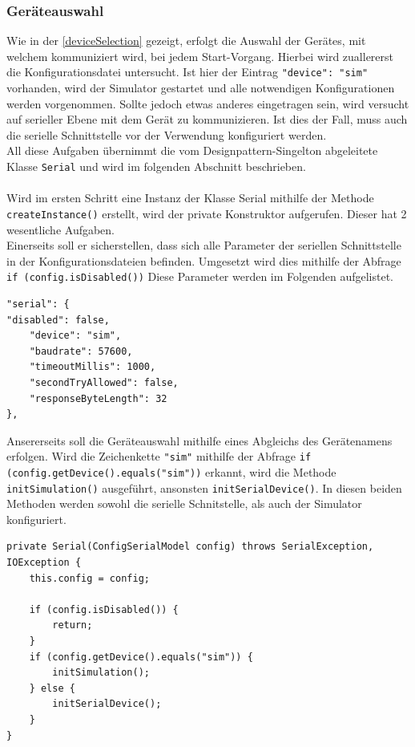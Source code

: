 \subsubsection{Geräteauswahl} \label{sssec:deviceSelection}
Wie in der \autoref{deviceSelection} gezeigt, erfolgt die Auswahl der Gerätes, mit welchem kommuniziert wird, bei jedem Start-Vorgang.
Hierbei wird zuallererst die Konfigurationsdatei untersucht.
Ist hier der Eintrag \lstinline[style=json]{"device": "sim"} vorhanden, wird der Simulator gestartet und alle notwendigen Konfigurationen werden vorgenommen.
Sollte jedoch etwas anderes eingetragen sein, wird versucht auf serieller Ebene mit dem Gerät zu kommunizieren.
Ist dies der Fall, muss auch die serielle Schnittstelle vor der Verwendung konfiguriert werden.\\
All diese Aufgaben übernimmt die vom Designpattern-Singelton abgeleitete Klasse \lstinline[style=java]{Serial} und wird im folgenden Abschnitt beschrieben.\\\\
Wird im ersten Schritt eine Instanz der Klasse Serial mithilfe der Methode \lstinline[style=java]{createInstance()} erstellt, wird der private Konstruktor aufgerufen.
Dieser hat 2 wesentliche Aufgaben.\\
Einerseits soll er sicherstellen, dass sich alle Parameter der seriellen Schnittstelle in der Konfigurationsdateien befinden.
Umgesetzt wird dies mithilfe der Abfrage \lstinline[style=java]{if (config.isDisabled())}
Diese Parameter werden im Folgenden aufgelistet.
\begin{lstlisting}[style=json,caption=json-Codebeispiel,label=jsonSerial]
"serial": {
"disabled": false,
    "device": "sim",
    "baudrate": 57600,
    "timeoutMillis": 1000,
    "secondTryAllowed": false,
    "responseByteLength": 32
},
\end{lstlisting}
Ansererseits soll die Geräteauswahl mithilfe eines Abgleichs des Gerätenamens erfolgen.
Wird die Zeichenkette \lstinline[style=json]{"sim"} mithilfe der Abfrage \lstinline[style=java]{if (config.getDevice().equals("sim"))} erkannt, wird die Methode \lstinline[style=java]{initSimulation()} ausgeführt, ansonsten \lstinline[style=java]{initSerialDevice()}.
In diesen beiden Methoden werden sowohl die serielle Schnitstelle, als auch der Simulator konfiguriert.
\begin{lstlisting}[style=java,caption=Java-Codebeispiel,label=commThreadSend]
private Serial(ConfigSerialModel config) throws SerialException, IOException {
    this.config = config;

    if (config.isDisabled()) {
        return;
    }
    if (config.getDevice().equals("sim")) {
        initSimulation();
    } else {
        initSerialDevice();
    }
}
\end{lstlisting}

